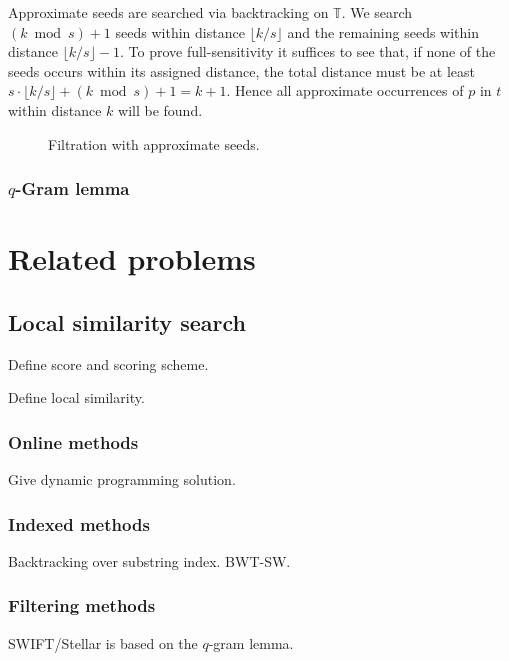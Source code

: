 Approximate seeds are searched via backtracking on $\mathbb{T}$.
We search $(k \bmod{s}) + 1$ seeds within distance $\lfloor k/s \rfloor$ and the remaining seeds within distance $\lfloor k/s \rfloor - 1$.
To prove full-sensitivity it suffices to see that, if none of the seeds occurs within its assigned distance, the total distance must be at least $s \cdot \lfloor k/s \rfloor + (k \bmod s) + 1 = k + 1$.
Hence all approximate occurrences of $p$ in $t$ within distance $k$ will be found.

\begin{figure}[h]
\caption{Filtration with approximate seeds.}
\label{fig:seeds-apx}
\end{figure}

\subsubsection{$q$-Gram lemma}


\section{Related problems}


\subsection{Local similarity search}

Define score and scoring scheme.

Define local similarity.

\subsubsection{Online methods}
Give dynamic programming solution.

\subsubsection{Indexed methods}
Backtracking over substring index. BWT-SW.

\subsubsection{Filtering methods}
SWIFT/Stellar is based on the $q$-gram lemma.


